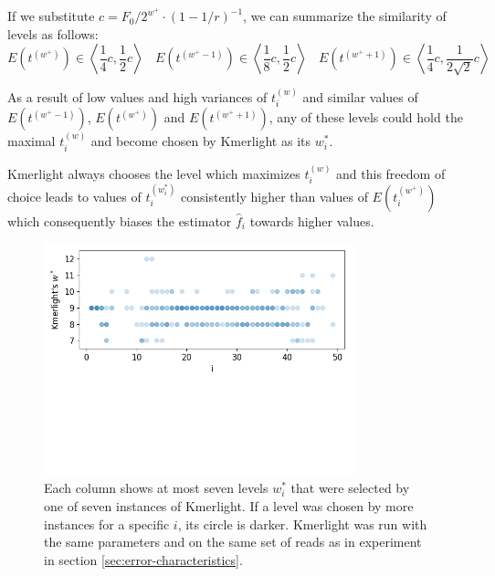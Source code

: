 If we substitute $c = F_0/2^{w^+} \cdot (1-1/r)^{-1}$,
we can summarize the similarity of levels as follows:
\begin{equation} \label{eq:level-similarity}
E(t^{(w^+)}) \in \left\langle \frac{1}{4}c, \frac{1}{2}c  \right\rangle ~~~~
E(t^{(w^+-1)}) \in \left\langle \frac{1}{8}c, \frac{1}{2}c  \right\rangle ~~~~
E(t^{(w^++1)}) \in \left\langle \frac{1}{4}c,\frac{1}{2\sqrt{2}}c  \right\rangle
\end{equation}

As a result of low values and high variances of $t_i^{(w)}$ and similar
values of $E(t^{(w^+-1)})$, $E(t^{(w^+)})$ and $E(t^{(w^++1)})$, any of these levels could
hold the maximal $t_i^{(w)}$ and become chosen by Kmerlight as its $w^*_i$. 

Kmerlight always chooses the level which maximizes $t_i^{(w)}$ and this freedom of choice 
leads to values of $t_i^{(w^*_i)}$ consistently higher than values of $E(t_i^{(w^+)})$
which consequently biases the estimator $\hat f_i$ towards higher values.

\begin{figure}[h]
\centerline{\includegraphics[width=0.8\textwidth, trim={0cm, 5.5cm, 0cm, 0cm}, clip]{images/kmerlight_wstar.png}}
\caption[$w_i^*$ selected by Kmerlight]{Each column 
shows at most seven levels $w_i^*$ that were selected by one of seven instances of Kmerlight.
If a level was chosen by more instances for a specific $i$, its circle is darker.
Kmerlight was run with the same parameters and on the same set of reads as in 
experiment in section \ref{sec:error-characteristics}.}
\label{img:w-selected-by-kmerlight}
\end{figure}

